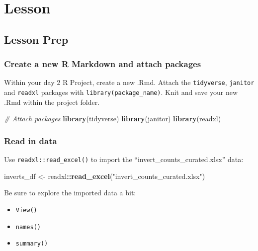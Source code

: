 \documentclass[]{book}
\newenvironment{Shaded}{\begin{snugshade}}{\end{snugshade}}
\newcommand{\CommentTok}[1]{\textcolor[rgb]{0.56,0.35,0.01}{\textit{#1}}}
\newcommand{\KeywordTok}[1]{\textcolor[rgb]{0.13,0.29,0.53}{\textbf{#1}}}
\newcommand{\NormalTok}[1]{#1}
\newcommand{\OperatorTok}[1]{\textcolor[rgb]{0.81,0.36,0.00}{\textbf{#1}}}
\newcommand{\StringTok}[1]{\textcolor[rgb]{0.31,0.60,0.02}{#1}}
\providecommand{\tightlist}{%
  \setlength{\itemsep}{0pt}\setlength{\parskip}{0pt}}
\begin{document}
\hypertarget{lesson-2}{%
\section{Lesson}\label{lesson-2}}

\hypertarget{lesson-prep}{%
\subsection{Lesson Prep}\label{lesson-prep}}

\hypertarget{create-a-new-r-markdown-and-attach-packages}{%
\subsubsection{Create a new R Markdown and attach packages}\label{create-a-new-r-markdown-and-attach-packages}}

Within your day 2 R Project, create a new .Rmd. Attach the \texttt{tidyverse}, \texttt{janitor} and \texttt{readxl} packages with \texttt{library(package\_name)}. Knit and save your new .Rmd within the project folder.

\begin{Shaded}
\begin{Highlighting}[]
\CommentTok{# Attach packages}
\KeywordTok{library}\NormalTok{(tidyverse)}
\KeywordTok{library}\NormalTok{(janitor)}
\KeywordTok{library}\NormalTok{(readxl)}
\end{Highlighting}
\end{Shaded}

\hypertarget{read-in-data}{%
\subsubsection{Read in data}\label{read-in-data}}

Use \texttt{readxl::read\_excel()} to import the ``invert\_counts\_curated.xlsx'' data:

\begin{Shaded}
\begin{Highlighting}[]
\NormalTok{inverts_df <-}\StringTok{ }\NormalTok{readxl}\OperatorTok{::}\KeywordTok{read_excel}\NormalTok{(}\StringTok{"invert_counts_curated.xlsx"}\NormalTok{)}
\end{Highlighting}
\end{Shaded}

Be sure to explore the imported data a bit:

\begin{itemize}
\tightlist
\item
  \texttt{View()}
\item
  \texttt{names()}
\item
  \texttt{summary()}
\end{itemize}
\end{document}
